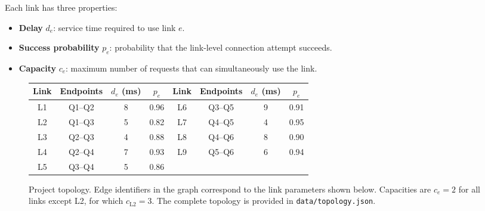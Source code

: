 \documentclass[11pt]{article}
\begin{document}
Each link has three properties:
\begin{itemize}
    \item \textbf{Delay} $d_e$: service time required to use link $e$.
    \item \textbf{Success probability} $p_e$: probability that the link-level connection attempt succeeds.
    \item \textbf{Capacity} $c_e$: maximum number of requests that can simultaneously use the link.
\end{itemize}

\begin{figure}[ht]
\centering
{}

\vspace{4pt}
\footnotesize
\begin{tabular}{cccc@{\hspace{12mm}}cccc}
\toprule
Link & Endpoints & $d_e$ (ms) & $p_e$ & Link & Endpoints & $d_e$ (ms) & $p_e$ \\
\midrule
L1 & Q1--Q2 & 8 & 0.96 & L6 & Q3--Q5 & 9 & 0.91 \\
L2 & Q1--Q3 & 5 & 0.82 & L7 & Q4--Q5 & 4 & 0.95 \\
L3 & Q2--Q3 & 4 & 0.88 & L8 & Q4--Q6 & 8 & 0.90 \\
L4 & Q2--Q4 & 7 & 0.93 & L9 & Q5--Q6 & 6 & 0.94 \\
L5 & Q3--Q4 & 5 & 0.86 & & & & \\
\bottomrule
\end{tabular}
\normalsize
\caption{Project topology. Edge identifiers in the graph correspond to the link parameters shown below. Capacities are $c_e=2$ for all links except L2, for which $c_{\mathrm{L2}}=3$. The complete topology is provided in \texttt{data/topology.json}.}
\label{fig:topology}
\end{figure}
\end{document}
